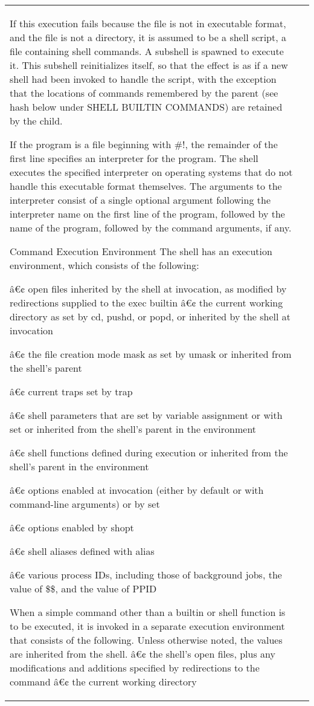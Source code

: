 \documentclass[11pt]{article}
\begin{document}
\begin{longtable}{p{}p{}}
{{{If this execution fails because the file is not in executable format, and the file is not a directory, it is assumed to be a shell script, a file containing shell commands. A subshell is spawned to execute it. This subshell reinitializes itself, so that the effect is as if a new shell had been invoked to handle the script, with the exception that the locations of commands remembered by the parent (see hash below under SHELL BUILTIN COMMANDS) are retained by the child.

If the program is a file beginning with #!, the remainder of the first line specifies an interpreter for the program. The shell executes the specified interpreter on operating systems that do not handle this executable format themselves. The arguments to the interpreter consist of a single optional argument following the interpreter name on the first line of the program, followed by the name of the program, followed by the command arguments, if any.

Command Execution Environment
The shell has an execution environment, which consists of the following:

â€¢ open files inherited by the shell at invocation, as modified by redirections supplied to the exec builtin
â€¢ the current working directory as set by cd, pushd, or popd, or inherited by the shell at invocation

â€¢ the file creation mode mask as set by umask or inherited from the shell's parent

â€¢ current traps set by trap

â€¢ shell parameters that are set by variable assignment or with set or inherited from the shell's parent in the environment

â€¢ shell functions defined during execution or inherited from the shell's parent in the environment

â€¢ options enabled at invocation (either by default or with command-line arguments) or by set

â€¢ options enabled by shopt

â€¢ shell aliases defined with alias

â€¢ various process IDs, including those of background jobs, the value of \$\$, and the value of PPID

When a simple command other than a builtin or shell function is to be executed, it is invoked in a separate execution environment that consists of the following. Unless otherwise noted, the values are inherited from the shell.
â€¢ the shell's open files, plus any modifications and additions specified by redirections to the command
â€¢ the current working directory

}}}
\end{longtable}
\end{document}
